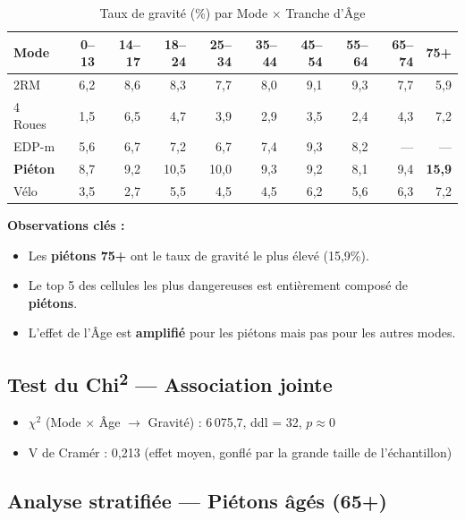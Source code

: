 \documentclass[12pt,a4paper]{article}
\begin{document}
\begin{table}[H]
\centering
\caption{Taux de gravité (\%) par Mode $\times$ Tranche d'\^Age}
\label{tab:mode_age}
\small
\begin{tabular}{@{}l r r r r r r r r r@{}}
\toprule
\textbf{Mode} & \textbf{0--13} & \textbf{14--17} & \textbf{18--24}
  & \textbf{25--34} & \textbf{35--44} & \textbf{45--54}
  & \textbf{55--64} & \textbf{65--74} & \textbf{75+} \\
\midrule
2RM           & 6,2 & 8,6 & 8,3 & 7,7 & 8,0 & 9,1 & 9,3 & 7,7 & 5,9 \\
4 Roues       & 1,5 & 6,5 & 4,7 & 3,9 & 2,9 & 3,5 & 2,4 & 4,3 & 7,2 \\
EDP-m         & 5,6 & 6,7 & 7,2 & 6,7 & 7,4 & 9,3 & 8,2 & --- & --- \\
\textbf{Piéton} & 8,7 & 9,2 & 10,5 & 10,0 & 9,3 & 9,2 & 8,1 & 9,4 & \textbf{15,9} \\
Vélo          & 3,5 & 2,7 & 5,5 & 4,5 & 4,5 & 6,2 & 5,6 & 6,3 & 7,2 \\
\bottomrule
\end{tabular}
\end{table}

\textbf{Observations clés :}
\begin{itemize}
  \item Les \textbf{piétons 75+} ont le taux de gravité le plus élevé
        (15,9\%).
  \item Le top 5 des cellules les plus dangereuses est entièrement composé
        de \textbf{piétons}.
  \item L'effet de l'\^Age est \textbf{amplifié} pour les piétons mais pas
        pour les autres modes.
\end{itemize}

\subsection{Test du Chi\textsuperscript{2} --- Association jointe}

\begin{itemize}
  \item $\chi^2$ (Mode $\times$ \^Age $\rightarrow$ Gravité) : 6\,075,7,
        ddl = 32, $p \approx 0$
  \item V de Cramér : 0,213 (effet moyen, gonflé par la grande taille
        de l'\'{e}chantillon)
\end{itemize}

\subsection{Analyse stratifiée --- Piétons \^{a}gés (65+)}
\end{document}
